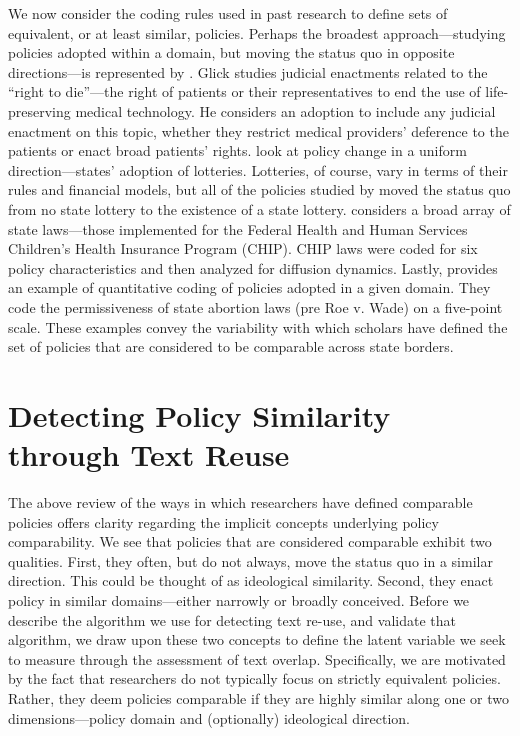 \documentclass[12pt]{article} %
\begin{document}
We now consider the coding rules used in past research to define sets of equivalent, or at least similar, policies. Perhaps the broadest approach---studying policies adopted within a domain, but moving the status quo in opposite directions---is represented by \citet{glick1992judicial}. Glick studies judicial enactments related to the ``right to die''---the right of patients or their representatives to end the use of life-preserving medical technology. He considers an adoption to include any judicial enactment on this topic, whether they restrict medical providers' deference to the patients or enact broad patients' rights.  \citet{berry1990} look at policy change in a uniform direction---states' adoption of lotteries. Lotteries, of course, vary in terms of their rules and financial models, but all of the policies studied by \citet{berry1990} moved the status quo from no state lottery to the existence of a state lottery. \citet{volden2006} considers a broad array of state laws---those implemented for the Federal Health and Human Services Children's Health Insurance Program (CHIP). CHIP laws were coded for six policy characteristics and then analyzed for diffusion dynamics. Lastly, \citet{mooney1995legislative} provides an example of quantitative coding of policies adopted in a given domain. They code the permissiveness of state abortion laws (pre Roe v. Wade) on a five-point scale. These examples convey the variability with which scholars have defined the set of policies that are considered to be comparable across state borders.


\section{Detecting Policy Similarity through Text Reuse}

The above review of the ways in which researchers have defined comparable policies offers clarity regarding the implicit concepts underlying policy comparability. We see that policies that are considered comparable exhibit two qualities. First, they often, but do not always, move the status quo in a similar direction. This could be thought of as ideological similarity. Second, they enact policy in similar domains---either narrowly or broadly conceived. Before we describe the algorithm we use for detecting text re-use, and validate that algorithm, we draw upon these two concepts to define the latent variable we seek to measure through the assessment of text overlap. Specifically, we are motivated by the fact that researchers do not typically focus on strictly equivalent policies. Rather, they deem policies comparable if they are highly similar along one or two dimensions---policy domain and (optionally) ideological direction. 
\end{document}
